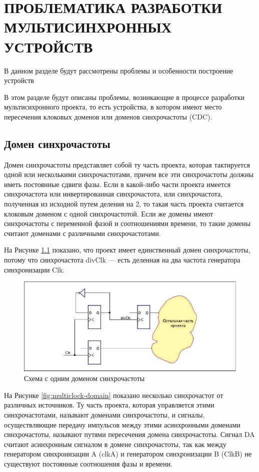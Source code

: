 \newcommand{\erassistant}{ErAssistant~}

\chapter{ПРОБЛЕМАТИКА РАЗРАБОТКИ\\ МУЛЬТИСИНХРОННЫХ УСТРОЙСТВ}

В данном разделе будут рассмотрены проблемы и особенности построение устройств


В этом разделе будут описаны проблемы, возникающие в процессе разработки мультисихронного проекта, то есть устройства, в котором имеют место пересечения клоковых доменов или доменов синхрочастоты (CDC).

\section{Домен синхрочастоты}
Домен синхрочастоты представляет собой ту часть проекта, которая тактируется одной или несколькими синхрочастотами, причем все эти синхрочастоты должны иметь постоянные сдвиги фазы. Если в какой-либо части проекта имеется синхрочастота или инвертированная синхрочастота, или синхрочастота, полученная из исходной путем деления на 2, то такая часть проекта считается клоковым доменом с одной синхрочастотой. Если же домены имеют синхрочастоты с переменной фазой и соотношениями времени, то такие домены считают доменами с различными синхрочастотами. 

На Рисунке \ref{fig:clock-domain} показано, что проект имеет единственный домен синхрочастоты, потому что синхрочастота divClk --- есть деленная на два частота генератора синхронизации Clk.

\begin{figure}[h!]
	\centering
	\includegraphics[width=0.6\linewidth]{course-scheme/images/clock-domain}
	\caption{Схема с одним доменом синхрочастоты}
	\label{fig:clock-domain}
\end{figure}


На Рисунке \ref{fig:multiclock-domain} показано несколько синхрочастот от различных источников. Ту часть проекта, которая управляется этими синхрочастотами, называют доменами синхрочастоты, и сигналы, осуществляющие передачу импульсов между этими асинхронными доменами синхрочастоты, называют путями пересечения домена синхрочастоты. Сигнал DA считают асинхронным сигналом в домене синхрочастоты, так как между генератором синхронизации A (clkA) и генератором синхронизации B (ClkB) не существуют постоянные соотношения фазы и времени.

